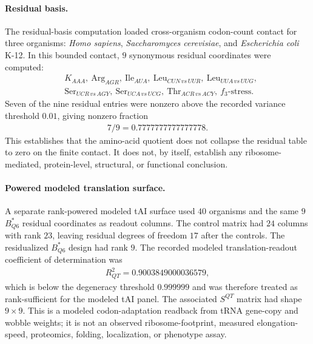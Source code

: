 \paragraph{Residual basis.}
The residual-basis computation loaded cross-organism codon-count contact for three organisms: \emph{Homo sapiens}, \emph{Saccharomyces cerevisiae}, and \emph{Escherichia coli} K-12.  In this bounded contact, $9$ synonymous residual coordinates were computed:
$$
\begin{aligned}
&K_{AAA},\ \mathrm{Arg}_{AGR},\ \mathrm{Ile}_{AUA},\ \mathrm{Leu}_{CUN\,vs\,UUR},\ \mathrm{Leu}_{UUA\,vs\,UUG},\\
&\mathrm{Ser}_{UCR\,vs\,AGY},\ \mathrm{Ser}_{UCA\,vs\,UCG},\ \mathrm{Thr}_{ACR\,vs\,ACY},\ f_3\text{-stress}.
\end{aligned}
$$
Seven of the nine residual entries were nonzero above the recorded variance threshold $0.01$, giving nonzero fraction
$$
\begin{aligned}
7/9 = 0.7777777777777778.
\end{aligned}
$$
This establishes that the amino-acid quotient does not collapse the residual table to zero on the finite contact.  It does not, by itself, establish any ribosome-mediated, protein-level, structural, or functional conclusion.

\paragraph{Powered modeled translation surface.}
A separate rank-powered modeled tAI surface used $40$ organisms and the same $9$ $B^{\ast}_{Q6}$ residual coordinates as readout columns.  The control matrix had $24$ columns with rank $23$, leaving residual degrees of freedom $17$ after the controls.  The residualized $B^{\ast}_{Q6}$ design had rank $9$.  The recorded modeled translation-readout coefficient of determination was
$$
\begin{aligned}
R^2_{QT}=0.9003849000036579,
\end{aligned}
$$
which is below the degeneracy threshold $0.999999$ and was therefore treated as rank-sufficient for the modeled tAI panel.  The associated $S^{QT}$ matrix had shape $9\times 9$.  This is a modeled codon-adaptation readback from tRNA gene-copy and wobble weights; it is not an observed ribosome-footprint, measured elongation-speed, proteomics, folding, localization, or phenotype assay.


